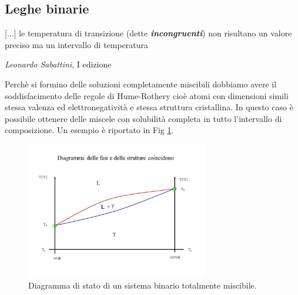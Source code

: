 \subsection{Leghe binarie}

\epigraph{[...] le temperatura di transizione (dette \textbf{\textit{incongruenti}}) non risultano un valore preciso ma un intervallo di temperatura}{\textit{Leonardo Sabattini}, I edizione}

Perchè si formino delle soluzioni completamente miscibili dobbiamo avere il soddisfacimento delle regole di Hume-Rothery cioè atomi con dimensioni simili stessa valenza ed elettronegatività e stessa struttura cristallina. In questo caso è possibile ottenere delle miscele con solubilità completa in tutto l'intervallo di composizione. Un esempio è riportato in Fig \ref{diagramma_tot_misc}.
\begin{figure}[h]
    \centering
    \includegraphics[width=8cm]{Diagrammi di fase/diagramma_stato1.jpg}
    \caption{Diagramma di stato di un sistema binario totalmente miscibile.}
    \label{diagramma_tot_misc}
\end{figure}

